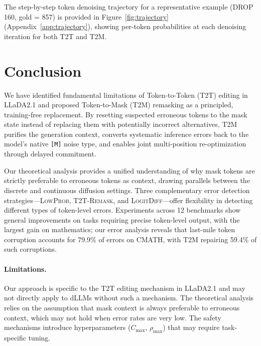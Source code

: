 \documentclass{article}
\newcommand{\mask}{\texttt{[M]}}
\newcommand{\TtoT}{\textrm{T2T}}
\newcommand{\TtoM}{\textrm{T2M}}
\begin{document}
The step-by-step token denoising trajectory for a representative example (DROP 160, gold = 857) is provided in Figure~\ref{fig:trajectory} (Appendix~\ref{app:trajectory}), showing per-token probabilities at each denoising iteration for both \TtoT{} and \TtoM{}.

\section{Conclusion}
\label{sec:conclusion}

We have identified fundamental limitations of Token-to-Token (\TtoT{}) editing in LLaDA2.1 and proposed Token-to-Mask (\TtoM{}) remasking as a principled, training-free replacement. By resetting suspected erroneous tokens to the mask state instead of replacing them with potentially incorrect alternatives, \TtoM{} purifies the generation context, converts systematic inference errors back to the model's native \mask{} noise type, and enables joint multi-position re-optimization through delayed commitment.

Our theoretical analysis provides a unified understanding of why mask tokens are strictly preferable to erroneous tokens as context, drawing parallels between the discrete and continuous diffusion settings. Three complementary error detection strategies---\textsc{LowProb}, \textsc{T2T-Remask}, and \textsc{LogitDiff}---offer flexibility in detecting different types of token-level errors. Experiments across 12 benchmarks show general improvements on tasks requiring precise token-level output, with the largest gain on mathematics; our error analysis reveals that last-mile token corruption accounts for 79.9\% of errors on CMATH, with \TtoM{} repairing 59.4\% of such corruptions.

\paragraph{Limitations.} Our approach is specific to the \TtoT{} editing mechanism in LLaDA2.1 and may not directly apply to dLLMs without such a mechanism. The theoretical analysis relies on the assumption that mask context is always preferable to erroneous context, which may not hold when error rates are very low. The safety mechanisms introduce hyperparameters ($C_{\max}$, $\rho_{\max}$) that may require task-specific tuning.
\end{document}
